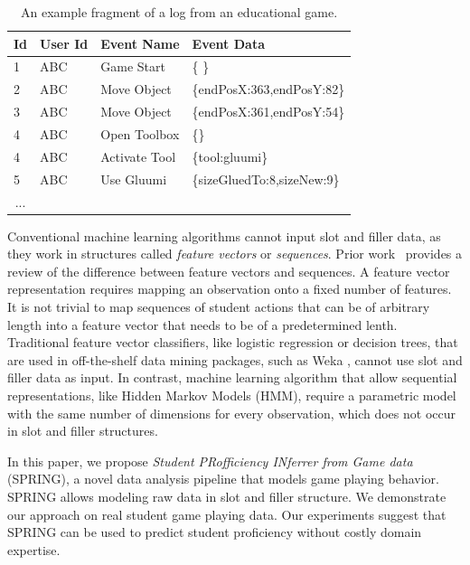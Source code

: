 \documentclass{sigchi}
\def\algname{SPRING\xspace}
\begin{document}
\begin{table}[tbh]
	\begin{tabular}{@{}llll@{}}
		\toprule
		\textbf{Id}             & \textbf{User Id} & \textbf{Event Name} & \textbf{Event Data}        \\ \midrule
		1                       & ABC              & Game Start          & \{ \}                        \\
		2                       & ABC              & Move Object         & \{endPosX:363,endPosY:82\} \\
		3                       & ABC              & Move Object         & \{endPosX:361,endPosY:54\} \\
		4                       & ABC              & Open Toolbox        & \{\}        \\
		4                       & ABC              & Activate Tool        & \{tool:gluumi\}        \\
		5                       & ABC              & Use Gluumi        & \{sizeGluedTo:8,sizeNew:9\} \\        
		\multicolumn{1}{c}{...} &                  &                     &                            \\ \bottomrule
	\end{tabular}
	\caption{An example fragment of a log from an educational game. \label{tbl:log_example}}
\end{table}

Conventional machine learning algorithms cannot input slot and filler data, as they  work in  structures called \textit{feature vectors} or \textit{sequences}.
Prior work~\cite{sequences} provides a   review of  the difference between feature vectors and sequences.
A feature vector representation requires mapping an observation onto a fixed number of features.
It is not trivial to map sequences of student actions that can be of arbitrary length into a feature vector that needs to be of a predetermined lenth.
Traditional feature vector classifiers,  like logistic regression or decision trees,  that are used in off-the-shelf data mining packages, such as Weka \cite{hall2009weka}, cannot  use slot and filler data as input. 
In contrast, machine learning algorithm that allow sequential representations, like Hidden Markov Models (HMM), require a parametric model with the same number of dimensions for every observation, which does not occur in slot and filler structures.

In this paper, we propose \textit{Student PRofficiency INferrer from Game data} (SPRING), a novel data analysis pipeline that models game playing behavior.
\algname allows modeling raw data in slot and filler structure.
We demonstrate our approach on real student game playing data.
Our experiments suggest that \algname can be used to predict student proficiency  without costly domain expertise.
\end{document}
